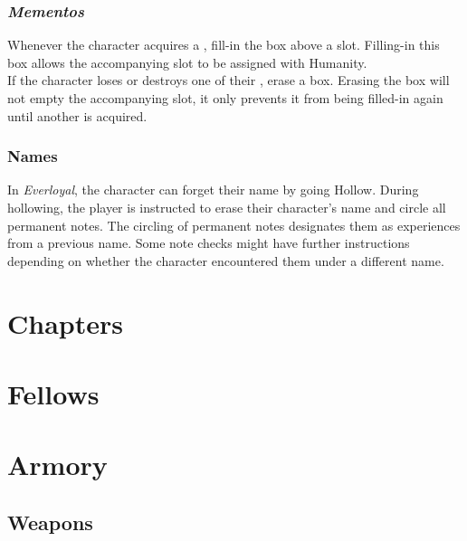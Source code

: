 \documentclass[12pt]{article}
\begin{document}
\begin{multicols*}{2}
\subsubsection{\emph{Mementos}}
\hypertarget{mementos}{}\hypertarget{memento}{}
Whenever the character acquires a , fill-in the  box above a  slot. Filling-in this box allows the accompanying  slot to be assigned with Humanity.\\
If the character loses or destroys one of their , erase a  box. Erasing the  box will not empty the accompanying  slot, it only prevents it from being filled-in again until another  is acquired.

\subsubsection{Names}
In \emph{Everloyal}, the character can forget their name by going Hollow. During hollowing, the player is instructed to erase their character’s name and circle all permanent notes. The circling of permanent notes designates them as experiences from a previous name. Some note checks might have further instructions depending on whether the character encountered them under a different name.

\end{multicols*}
\pagebreak



\section{Chapters}



\pagebreak

\section{Fellows}


\pagebreak

\renewcommand{\arraystretch}{1.5}

\section{Armory}
\subsection{Weapons}
\end{document}
